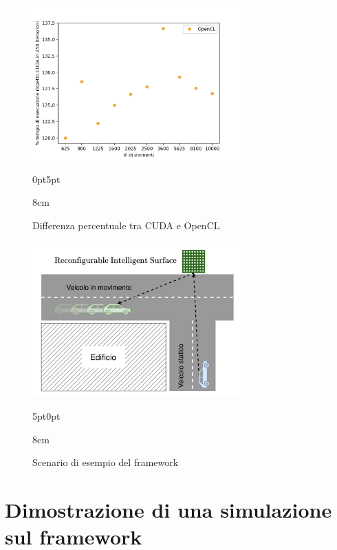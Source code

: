 \begin{figure}[!ht]
  \begin{minipage}[t]{0.5\linewidth}
    \centering
    \includegraphics[width=8cm]{images/results/gain-cuda-vs-opencl.png}
    \begin{adjustwidth}
      {0pt}{5pt}
      \begin{varwidth}
        {8cm}
        \caption{Differenza percentuale tra CUDA e OpenCL}
        \label{fig:risultati-cuda-opencl}
      \end{varwidth}
    \end{adjustwidth}
  \end{minipage}
  \begin{minipage}[t]{0.5\linewidth}
    \centering
    \includegraphics[width=8cm]{images/examples/framework-example.png}
    \begin{adjustwidth}
      {5pt}{0pt}
      \begin{varwidth}
        {8cm}
        \caption{Scenario di esempio del framework}
        \label{fig:framework-scenario}
      \end{varwidth}
    \end{adjustwidth}
  \end{minipage}
\end{figure}

\vfill

\section{Dimostrazione di una simulazione sul framework}
\label{sec:dimostrazione}

